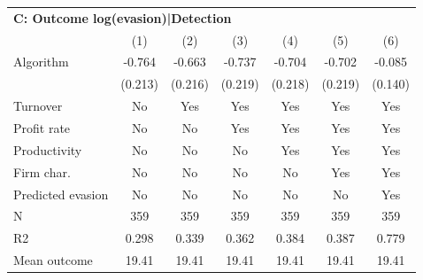 \begin{tabular}{lcccccc}
\midrule \multicolumn{7}{l}{\textbf{C: Outcome log(evasion)|Detection}} \\ \multicolumn{1}{l}{} & (1) & (2) & (3) & (4) & (5) & (6) \\ \midrule
Algorithm   &      -0.764\sym{***}&      -0.663\sym{***}&      -0.737\sym{***}&      -0.704\sym{***}&      -0.702\sym{***}&      -0.085         \\
            &     (0.213)         &     (0.216)         &     (0.219)         &     (0.218)         &     (0.219)         &     (0.140)         \\
\midrule
Turnover    &          No         &         Yes         &         Yes         &         Yes         &         Yes         &         Yes         \\
Profit rate &          No         &          No         &         Yes         &         Yes         &         Yes         &         Yes         \\
Productivity&          No         &          No         &          No         &         Yes         &         Yes         &         Yes         \\
Firm char.  &          No         &          No         &          No         &          No         &         Yes         &         Yes         \\
Predicted evasion&          No         &          No         &          No         &          No         &          No         &         Yes         \\
N           &         359         &         359         &         359         &         359         &         359         &         359         \\
R2          &       0.298         &       0.339         &       0.362         &       0.384         &       0.387         &       0.779         \\
Mean outcome&       19.41         &       19.41         &       19.41         &       19.41         &       19.41         &       19.41         \\
\bottomrule \end{tabular}

